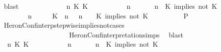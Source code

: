 \begin{isabellebody}
\ blast\isanewline
\ \ \ \ \isamarkupfalse%
\isanewline
\ \ \ \ \ \ \isamarkupfalse%
\ {\isasymGamma}\ n\ K\ K\ {\isasymPsi}\ {\isasymPhi}\isanewline
\ \ \ \ \ \ \isamarkupfalse%
\ {\isacartoucheopen}{\isacharparenleft}{\isasymGamma}\ n\ {\isasymturnstile}\ {\isasymPsi}\ {\isasymtriangleright}\ {\isasymPhi}\ {\isacharequal}\ {\isacharparenleft}{\isasymGamma}{\isacharcomma}\ n\ {\isasymturnstile}\ {\isacharparenleft}{\isacharparenleft}K\ implies\ not\ K\ {\isacharhash}\ {\isasymPsi}{\isacharparenright}\ {\isasymtriangleright}\ {\isasymPhi}{\isacharparenright}{\isacartoucheclose}\isanewline
\ \ \ \ \ \ \ {\isacartoucheopen}{\isacharparenleft}{\isasymGamma}\ n\ {\isasymturnstile}\ {\isasymPsi}\ {\isasymtriangleright}\ {\isasymPhi}\ {\isacharequal}\ {\isacharparenleft}{\isacharparenleft}{\isacharparenleft}K\ {\isasymnot}{\isasymUp}\ n{\isacharparenright}\ {\isacharhash}\ {\isasymGamma}{\isacharparenright}{\isacharcomma}\ n\ {\isasymturnstile}\ {\isasymPsi}\ {\isasymtriangleright}\ {\isacharparenleft}{\isacharparenleft}K\ implies\ not\ K\ {\isacharhash}\ {\isasymPhi}{\isacharparenright}{\isacharparenright}{\isacartoucheclose}\isanewline
\ \ \ \ \ \ \isamarkupfalse%
\ {\isacharquery}P\ \isamarkupfalse%
\ HeronConf{\isacharunderscore}interp{\isacharunderscore}stepwise{\isacharunderscore}implies{\isacharunderscore}not{\isacharunderscore}cases\isanewline
\ \ \ \ \ \ \ \ \ \ \ \ \ \ \ \ \ \ \ \ HeronConf{\isacharunderscore}interpretation{\isachardot}simps\ \isamarkupfalse%
\ blast\isanewline
\ \ \ \ \isamarkupfalse%
\isanewline
\ \ \ \ \ \ \isamarkupfalse%
\ {\isasymGamma}\ n\ K\ K\ {\isasymPsi}\ {\isasymPhi}\isanewline
\ \ \ \ \ \ \isamarkupfalse%
\ {\isacartoucheopen}{\isacharparenleft}{\isasymGamma}\ n\ {\isasymturnstile}\ {\isasymPsi}\ {\isasymtriangleright}\ {\isasymPhi}\ {\isacharequal}\ {\isacharparenleft}{\isasymGamma}{\isacharcomma}\ n\ {\isasymturnstile}\ {\isacharparenleft}{\isacharparenleft}K\ implies\ not\ K\ {\isacharhash}\ {\isasymPsi}{\isacharparenright}\ {\isasymtriangleright}\ {\isasymPhi}{\isacharparenright}{\isacartoucheclose}\isanewline

\end{isabellebody}
